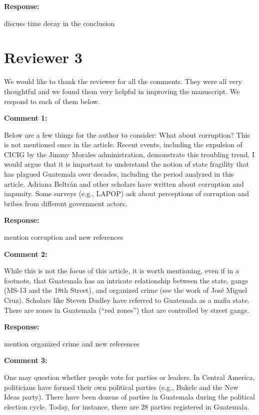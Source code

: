 \documentclass[12pt, a4paper, notitlepage]{article}
\begin{document}
\noindent\textbf{Response:} {}

discuss time decay in the conclusion

\newpage
\section*{Reviewer 3}

\textbf{{\color{red}{CHANGE }}} We would like to thank the reviewer for all the comments. They were all very thoughtful and we found them very helpful in improving the manuscript. We respond to each of them below.

\vspace{15pt}
\noindent\textbf{Comment 1:}
\begin{displayquote}
Below are a few things for the author to consider:
What about corruption? This is not mentioned once in the article. Recent events, including the expulsion of CICIG by the Jimmy Morales administration, demonstrate this troubling trend. I would argue that it is important to understand the notion of state fragility that has plagued Guatemala over decades, including the period analyzed in this article. Adriana Beltrán and other scholars have written about corruption and impunity. Some surveys (e.g., LAPOP) ask about perceptions of corruption and bribes from different government actors.
\end{displayquote}

\noindent\textbf{Response:} {}

mention corruption and new references

\vspace{15pt}
\noindent\textbf{Comment 2:}
\begin{displayquote}
While this is not the focus of this article, it is worth mentioning, even if in a footnote, that Guatemala has an intricate relationship between the state, gangs (MS-13 and the 18th Street), and organized crime (see the work of José Miguel Cruz). Scholars like Steven Dudley have referred to Guatemala as a mafia state. There are zones in Guatemala (“red zones”) that are controlled by street gangs.
\end{displayquote}

\noindent\textbf{Response:} {}

mention organized crime and new references

\vspace{15pt}
\noindent\textbf{Comment 3:}
\begin{displayquote}
One may question whether people vote for parties or leaders. In Central America, politicians have formed their own political parties (e.g., Bukele and the New Ideas party). There have been dozens of parties in Guatemala during the political election cycle. Today, for instance, there are 28 parties registered in Guatemala.
\end{displayquote}
\end{document}
